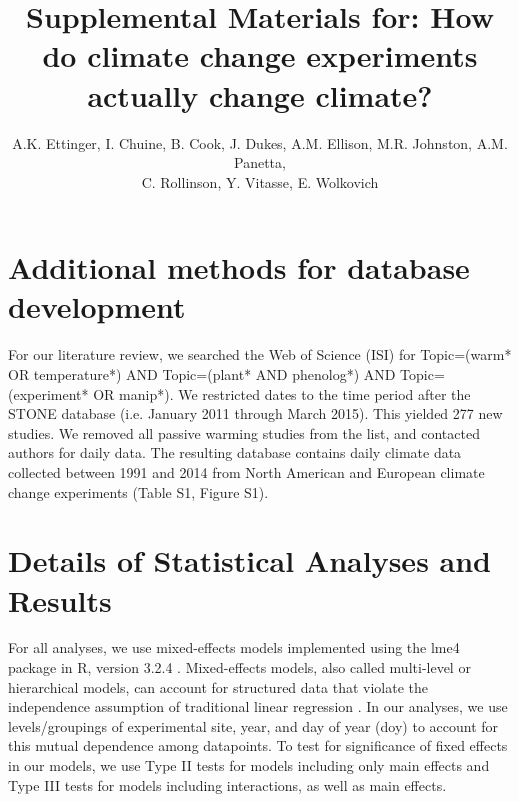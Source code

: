 \documentclass{article}
\begin{document}

\title{Supplemental Materials for: How do climate change experiments actually change climate?} %

\author{A.K. Ettinger, I. Chuine, B. Cook, J. Dukes, A.M. Ellison, M.R. Johnston, A.M. Panetta,\\ C. Rollinson, Y. Vitasse, E. Wolkovich}
\maketitle  %
\renewcommand{\thetable}{S\arabic{table}}
\renewcommand{\thefigure}{S\arabic{figure}}

\section* {Additional methods for database development}
For our literature review, we searched the Web of Science (ISI) for Topic=(warm* OR temperature*) AND Topic=(plant* AND phenolog*) AND Topic=(experiment* OR manip*). We restricted dates to the time period after the STONE database (i.e. January 2011 through March 2015). This yielded 277 new studies. We removed all passive warming studies from the list, and contacted authors for daily data. The resulting database contains daily climate data collected between 1991 and 2014 from North American and European climate change experiments (Table S1, Figure S1). 

\section* {Details of Statistical Analyses and Results}
For all analyses, we use mixed-effects models implemented using the lme4 package in R, version 3.2.4 \citep{bates2015,rcoreteam2016}. Mixed-effects models, also called multi-level or hierarchical models, can account for structured data that violate the independence assumption of traditional linear regression \citep{gelman2007}. In our analyses, we use levels/groupings of experimental site, year, and day of year (doy) to account for this mutual dependence among datapoints. To test for significance of fixed effects in our models, we use Type II tests for models including only main effects and Type III tests for models including interactions, as well as main effects. 
\end{document}
